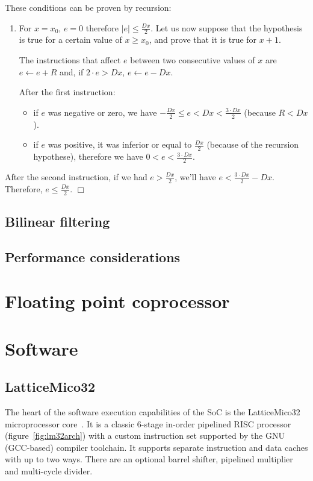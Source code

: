 \documentclass[a4paper,11pt]{kthesis}
\begin{document}
These conditions can be proven by recursion:
\begin{enumerate}
\item For $x = x_{0}$, $e = 0$ therefore $|e| \leq \frac{Dx}{2}$. Let us now suppose that the hypothesis is true for a certain value of $x \geq x_{0}$, and prove that it is true for $x+1$.

The instructions that affect $e$ between two consecutive values of $x$ are $e \leftarrow e + R$ and, if $2\cdot e > Dx$, $e \leftarrow e - Dx$.

After the first instruction:
\begin{itemize}
\item if $e$ was negative or zero, we have $-\frac{Dx}{2} \leq e < Dx < \frac{3 \cdot Dx}{2} $ (because $R < Dx$).
\item if $e$ was positive, it was inferior or equal to $\frac{Dx}{2}$ (because of the recursion hypothese), therefore we have $0 < e < \frac{3 \cdot Dx}{2} $.
\end{itemize}
\end{enumerate}

After the second instruction, if we had $e > \frac{Dx}{2}$, we'll have $e < \frac{3 \cdot Dx}{2} - Dx$. Therefore, $e \leq \frac{Dx}{2}$. $\Box$

\section{Bilinear filtering}

\section{Performance considerations}

\chapter{Floating point coprocessor}
\label{ch:pfpu}

\chapter{Software}
\label{ch:sw}
\section{LatticeMico32}
The heart of the software execution capabilities of the SoC is the LatticeMico32 microprocessor core~\cite{mico32}. It is a classic 6-stage in-order pipelined RISC processor (figure~\ref{fig:lm32arch}) with a custom instruction set supported by the GNU (GCC-based) compiler toolchain. It supports separate instruction and data caches with up to two ways. There are an optional barrel shifter, pipelined multiplier and multi-cycle divider.
\end{document}
